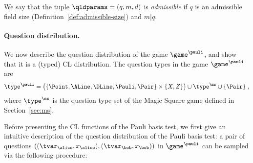 \begin{definition}\label{def:admissible}
  We say that the tuple $\qldparams=(q, m, d)$ is \emph{admissible} if $q$ is
  an admissible field size (Definition~\ref{def:admissible-size}) and $m | q$.
\end{definition}


\paragraph{Question distribution.}
We now describe the question distribution of the game $\game^\pauli$, and show
that it is a (typed) CL distribution.
The question types in the game $\game^\pauli$ are
\begin{equation}
  \label{eq:pauli-type}
  \type^\pauli= \bigl( \{\Point, \ALine, \DLine, \Pauli, \Pair \} \times \{X,Z\} \bigr)
  \cup \type^\ms \cup \{\Pair\}\;,
\end{equation}
where $\type^\ms$ is the question type set of the Magic Square game defined in
Section~\ref{sec:ms}.




Before presenting the CL functions of the Pauli basis test, we first give an
intuitive description of the question distribution of the Pauli basis test: a
pair of questions $((\tvar_\alice, x_\alice), (\tvar_\bob, x_\bob))$ in
$\game^\pauli$ can be sampled via the following procedure:

